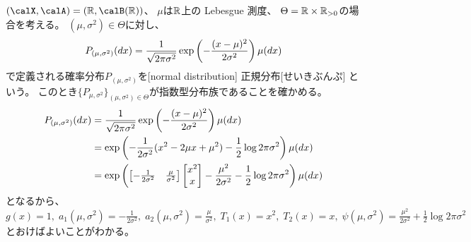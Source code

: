 \documentclass[report]{jlreq}
\begin{document}
\begin{example}[正規分布]
    $(\calX, \calA) = (\R, \calB(\R))$、
    $\mu$は$\mathbb{R}$上の Lebesgue 測度、
    $\Theta = \mathbb{R} \times \mathbb{R}_{> 0}$の場合を考える。
    $(\mu, \sigma^2) \in \Theta$に対し、
    \begin{equation}
        P_{(\mu, \sigma^2)}(dx)
            = \frac{1}{\sqrt{2\pi\sigma^2}} \exp\left({
                -\frac{(x - \mu)^2}{2\sigma^2}
            }\right) \mu(dx)
    \end{equation}
    で定義される確率分布$P_{(\mu, \sigma^2)}$を[normal distribution]
        {正規分布}[せいきぶんぷ]
    という。
    このとき$\{ P_{\mu, \sigma^2} \}_{(\mu, \sigma^2) \in \Theta}$が指数型分布族であることを確かめる。
    \begin{alignat}{1}
        P_{(\mu, \sigma^2)}(dx)
            &= \frac{1}{\sqrt{2\pi\sigma^2}} \exp\left({
                -\frac{(x - \mu)^2}{2\sigma^2}
            }\right) \mu(dx) \\
            &= \exp\left({
                -\frac{1}{2\sigma^2} (x^2 - 2\mu x + \mu^2)
                -\frac{1}{2} \log 2\pi\sigma^2
            }\right) \mu(dx) \\
            &= \exp\left({
                \begin{bmatrix}
                    -\frac{1}{2\sigma^2} & \frac{\mu}{\sigma^2}
                \end{bmatrix}
                \begin{bmatrix}
                    x^2 \\ x
                \end{bmatrix}
                - \frac{\mu^2}{2\sigma^2}
                - \frac{1}{2} \log 2\pi\sigma^2
            }\right) \mu(dx)
    \end{alignat}
    となるから、
    $g(x) = 1, \;
        a_1(\mu, \sigma^2) = -\frac{1}{2\sigma^2}, \;
        a_2(\mu, \sigma^2) = \frac{\mu}{\sigma^2}, \;
        T_1(x) = x^2, \;
        T_2(x) = x, \;
        \psi(\mu, \sigma^2) = \frac{\mu^2}{2\sigma^2} + \frac{1}{2} \log 2\pi\sigma^2$
    とおけばよいことがわかる。
\end{example}
\end{document}
